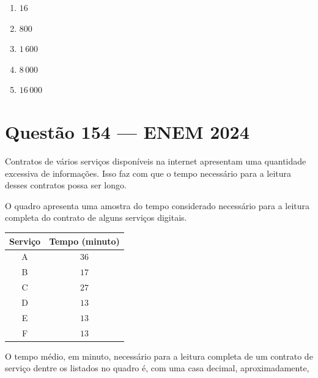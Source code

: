 \documentclass[11pt,a4paper]{article}
\begin{document}
\begin{enumerate}[label=(\Alph*)]
    \item $16$
    \item $800$
    \item $1\,600$
    \item $8\,000$
    \item $16\,000$
\end{enumerate}


\section*{Questão 154 --- ENEM 2024}

Contratos de vários serviços disponíveis na internet apresentam uma quantidade excessiva de informações. Isso faz com que o tempo necessário para a leitura desses contratos possa ser longo.

O quadro apresenta uma amostra do tempo considerado necessário para a leitura completa do contrato de alguns serviços digitais.

\begin{center}
    \begin{tabular}{cc}
        \toprule
        \textbf{Serviço} & \textbf{Tempo (minuto)} \\
        \midrule
        A                & $36$                    \\
        B                & $17$                    \\
        C                & $27$                    \\
        D                & $13$                    \\
        E                & $13$                    \\
        F                & $13$                    \\
        \bottomrule
    \end{tabular}
\end{center}


\vspace{0.4cm}

\noindent O tempo médio, em minuto, necessário para a leitura completa de um contrato de serviço dentre os listados no quadro é, com uma casa decimal, aproximadamente,
\end{document}
